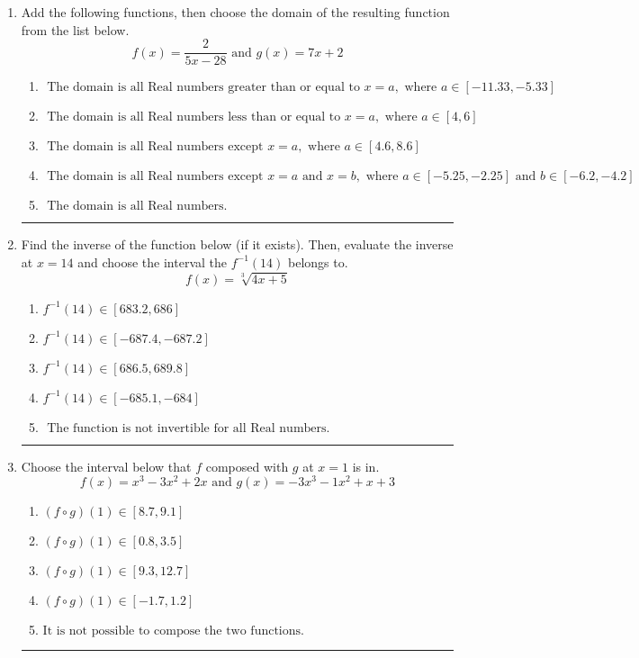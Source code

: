 \documentclass[14pt]{extbook}
\newcommand{\litem}[1]{\item#1\hspace*{-1cm}\rule{\textwidth}{0.4pt}}
\begin{document}
\begin{enumerate}
{\begin{enumerate}[label=\Alph*.]
\end{enumerate} }
\litem{
Add the following functions, then choose the domain of the resulting function from the list below.\[ f(x) = \frac{2}{5x-28} \text{ and } g(x) = 7x + 2 \]\begin{enumerate}[label=\Alph*.]
\item \( \text{ The domain is all Real numbers greater than or equal to } x = a, \text{ where } a \in [-11.33, -5.33] \)
\item \( \text{ The domain is all Real numbers less than or equal to } x = a, \text{ where } a \in [4, 6] \)
\item \( \text{ The domain is all Real numbers except } x = a, \text{ where } a \in [4.6, 8.6] \)
\item \( \text{ The domain is all Real numbers except } x = a \text{ and } x = b, \text{ where } a \in [-5.25, -2.25] \text{ and } b \in [-6.2, -4.2] \)
\item \( \text{ The domain is all Real numbers. } \)

\end{enumerate} }
\litem{
Find the inverse of the function below (if it exists). Then, evaluate the inverse at $x = 14$ and choose the interval the $f^{-1}(14)$ belongs to.\[ f(x) = \sqrt[3]{4 x + 5} \]\begin{enumerate}[label=\Alph*.]
\item \( f^{-1}(14) \in [683.2, 686] \)
\item \( f^{-1}(14) \in [-687.4, -687.2] \)
\item \( f^{-1}(14) \in [686.5, 689.8] \)
\item \( f^{-1}(14) \in [-685.1, -684] \)
\item \( \text{ The function is not invertible for all Real numbers. } \)

\end{enumerate} }
\litem{
Choose the interval below that $f$ composed with $g$ at $x=1$ is in.\[ f(x) = x^{3} -3 x^{2} +2 x \text{ and } g(x) = -3x^{3} -1 x^{2} +x + 3 \]\begin{enumerate}[label=\Alph*.]
\item \( (f \circ g)(1) \in [8.7, 9.1] \)
\item \( (f \circ g)(1) \in [0.8, 3.5] \)
\item \( (f \circ g)(1) \in [9.3, 12.7] \)
\item \( (f \circ g)(1) \in [-1.7, 1.2] \)
\item \( \text{It is not possible to compose the two functions.} \)


\end{enumerate}}
\end{enumerate}
\end{document}
